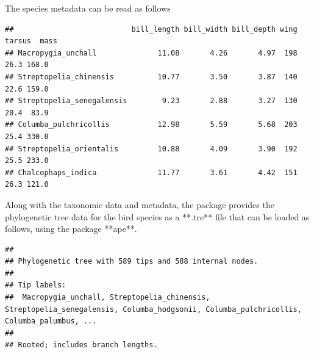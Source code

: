 \documentclass[12pt]{article}
\begin{document}
The species metadata can be read as follows

\begin{knitrout}
\color{fgcolor}\begin{kframe}
\begin{alltt}
 \hlkwb{<-} \hlstd{(}
\end{alltt}
\begin{verbatim}
##                           bill_length bill_width bill_depth wing tarsus  mass
## Macropygia_unchall              11.08       4.26       4.97  198   26.3 168.0
## Streptopelia_chinensis          10.77       3.50       3.87  140   22.6 159.0
## Streptopelia_senegalensis        9.23       2.88       3.27  130   20.4  83.9
## Columba_pulchricollis           12.98       5.59       5.68  203   25.4 330.0
## Streptopelia_orientalis         10.88       4.09       3.90  192   25.5 233.0
## Chalcophaps_indica              11.77       3.61       4.42  151   26.3 121.0
\end{verbatim}
\end{kframe}
\end{knitrout}


Along with the taxonomic data and metadata, the package provides the phylogenetic tree data for the bird species as a **.tre** file that can be loaded as follows, using the package **ape**.

\begin{knitrout}
\color{fgcolor}\begin{kframe}
\begin{alltt}
 \hlkwb{<-} \hlopt{::}\hlstd{(}\hlstd{(}\hlstd{,} \hlstd{,}
                              \hlstd{=} \hlstd{))}
\end{alltt}
\begin{verbatim}
## 
## Phylogenetic tree with 589 tips and 588 internal nodes.
## 
## Tip labels:
## 	Macropygia_unchall, Streptopelia_chinensis, Streptopelia_senegalensis, Columba_hodgsonii, Columba_pulchricollis, Columba_palumbus, ...
## 
## Rooted; includes branch lengths.
\end{verbatim}
\end{kframe}
\end{knitrout}
\end{document}
